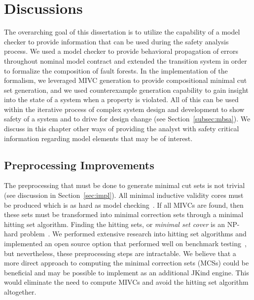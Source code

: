 \chapter{Discussions}
\label{ch:discussion}
The overarching goal of this dissertation is to utilize the capability of a model checker to provide information that can be used during the safety analysis process. We used a model checker to provide behavioral propagation of errors throughout nominal model contract and extended the transition system in order to formalize the composition of fault forests. In the implementation of the formalism, we leveraged MIVC generation to provide compositional minimal cut set generation, and we used counterexample generation capability to gain insight into the state of a system when a property is violated. All of this can be used within the iterative process of complex system design and development to show safety of a system and to drive for design change (see Section~\ref{subsec:mbsa}). We discuss in this chapter other ways of providing the analyst with safety critical information regarding model elements that may be of interest. 


\section{Preprocessing Improvements}
\label{sec:preproc}
The preprocessing that must be done to generate minimal cut sets is not trivial (see discussion in Section~\ref{sec:impl}). All minimal inductive validity cores must be produced which is as hard as model checking~\cite{GhassabaniGW16}. If all MIVCs are found, then these sets must be transformed into minimal correction sets through a minimal hitting set algorithm. Finding the hitting sets, or {\em minimal set cover} is an NP-hard problem~\cite{gainer2017minimal,karp1972reducibility}.%
We performed extensive research into hitting set algorithms and implemented an open source option that performed well on benchmark testing~\cite{murakami2013efficient}, but nevertheless, these preprocessing steps are intractable. We believe that a more direct approach to computing the minimal correction sets (MCSs) could be beneficial and may be possible to implement as an additional JKind engine. This would eliminate the need to compute MIVCs and avoid the hitting set algorithm altogether. 

